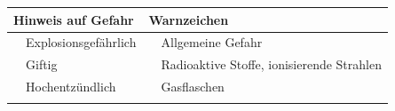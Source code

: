 \documentclass{article}
\begin{document}
\begin{center}
\begin{tabular}{|m{3.225cm}m{3.225cm}|m{3.225cm}m{3.225cm}|}
\hline
\multicolumn{2}{|m{6.65cm}|}{\centering
{\bfseries\upshape\color[rgb]{0.0,0.0,0.5019608} Hinweis auf
Gefahr}\par

} &
\multicolumn{2}{m{6.65cm}|}{\centering
{\bfseries\upshape\color[rgb]{0.0,0.0,0.5019608} Warnzeichen}\par

}\\\hline
{\centering   [Warning: Image ignored]
 \par}

 &
{\mdseries Explosionsgef\"ahrlich}

 &
{\centering   [Warning: Image ignored]
 \par}

 &
{\mdseries Allgemeine Gefahr}

\\\hline
{\centering   [Warning: Image ignored]
 \par}

 &
{\mdseries Giftig}

 &
{\centering   [Warning: Image ignored]
 \par}

 &
{\mdseries Radioaktive Stoffe, ionisierende Strahlen}

\\\hline
{\centering   [Warning: Image ignored]
 \par}

 &
{\mdseries Hochentz\"undlich}

 &
{\centering   [Warning: Image ignored]
 \par}

 &
{\mdseries Gasflaschen}

\\\hline
{\centering   [Warning: Image ignored]
 \par}


\end{tabular}
\end{center}
\end{document}
